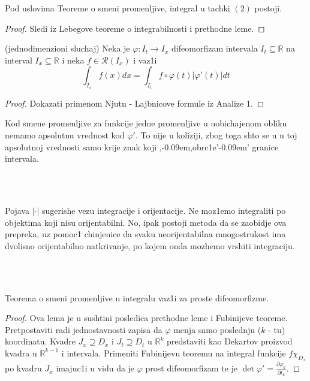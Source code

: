 \documentclass[a4paper,12pt]{article}
\newcommand{\RR}{\mathbb{R}}
\def\zn{,\kern-0.09em,} %
\def\zng{'\kern-0.09em' } %
\begin{document}
\begin{posl}
Pod uslovima Teoreme o smeni promenljive, integral u tachki $(2)$ postoji.
\end{posl}
\begin{proof}
Sledi iz Lebegove teoreme o integrabilnosti i prethodne leme.
\end{proof}

\begin{lema} (jednodimenzioni sluchaj) Neka je $\varphi: I_t \to I_x$ difeomorfizam intervala $I_t \subseteq \RR$ na interval $I_x \subseteq \RR$ i neka $f \in \mathcal R (I_x)$ i vaz1i 
\[\int_{I_x} f(x) dx = \int_{I_t} f \circ \varphi(t) | \varphi ' (t)| dt\]
\end{lema}

\begin{proof}
Dokazati primenom Njutn - Lajbnicove formule iz Analize 1.
\end{proof}

\begin{nap}
Kod smene promenljive za funkcije jedne promenljive u uobichajenom obliku nemamo apsolutnu vrednost kod $\varphi '$. To nije u koliziji,
	zbog toga shto se u u toj apsolutnoj vrednosti samo krije znak koji \zn obrc1e\zng granice intervala.
\end{nap}
\\ \\
\begin{nap}
Pojava $|\cdot|$ sugerishe vezu integracije i orijentacije. Ne moz1emo integraliti po objektima koji nisu orijentabilni. No, ipak postoji metoda da
se zaobidje ova prepreka, uz pomoc1 chinjenice da svaku neorijentabilna mnogostrukost ima dvolisno orijentabilno natkrivanje, po kojem onda
mozhemo vrshiti integraciju.
\end{nap}
\\ \\
\begin{lema}
Teorema o smeni promenljive u integralu vaz1i za proste difeomorfizme.
\end{lema}
\begin{proof}
Ova lema je u sushtini posledica prethodne leme i Fubinijeve teoreme. Pret\-po\-sta\-vi\-ti radi jednostavnosti zapisa da $\varphi$ menja samo poslednju ($k$ - tu) koordinatu. Kvadre $J_x \supseteq D_x$ i $J_t \supseteq D_t$ u $\RR^k$ predstaviti kao Dekartov proizvod kvadra u $\RR^{k-1}$ i intervala. Primeniti Fubinijevu teoremu na integral funkcije $f \chi_{D_x}$ po kvadru $J_x$ imajuc1i u vidu da je $\varphi$ prost difeomorfizam te je $\det \varphi ' = \frac{\partial \varphi_k}{\partial t_k}$.
\end{proof}
\end{document}

